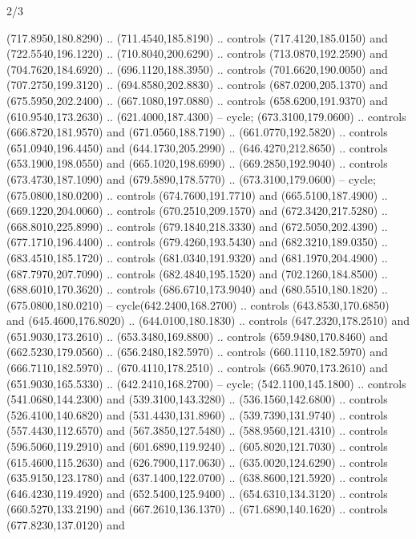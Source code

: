 \begin{flagdescription}{2/3}
\begin{scope}[xshift=0.5\flaglength,yshift=0.5\flagwidth,scale=\flagwidth/255]
\begin{scope}[y=-0.43pt, x=0.43pt,xshift=-193pt,yshift=133pt]
\begin{scope}[draw=black,line width=0.003\flagwidth]
\begin{scope}[fill=white]
  (717.8950,180.8290) .. (711.4540,185.8190) .. controls (717.4120,185.0150) and
  (722.5540,196.1220) .. (710.8040,200.6290) .. controls (713.0870,192.2590) and
  (704.7620,184.6920) .. (696.1120,188.3950) .. controls (701.6620,190.0050) and
  (707.2750,199.3120) .. (694.8580,202.8830) .. controls (687.0200,205.1370) and
  (675.5950,202.2400) .. (667.1080,197.0880) .. controls (658.6200,191.9370) and
  (610.9540,173.2630) .. (621.4000,187.4300) -- cycle;
 (673.3100,179.0600) .. controls (666.8720,181.9570) and
  (671.0560,188.7190) .. (661.0770,192.5820) .. controls (651.0940,196.4450) and
  (644.1730,205.2990) .. (646.4270,212.8650) .. controls (653.1900,198.0550) and
  (665.1020,198.6990) .. (669.2850,192.9040) .. controls (673.4730,187.1090) and
  (679.5890,178.5770) .. (673.3100,179.0600) -- cycle;
 (675.0800,180.0200) .. controls (674.7600,191.7710) and
  (665.5100,187.4900) .. (669.1220,204.0060) .. controls (670.2510,209.1570) and
  (672.3420,217.5280) .. (668.8010,225.8990) .. controls (679.1840,218.3330) and
  (672.5050,202.4390) .. (677.1710,196.4400) .. controls (679.4260,193.5430) and
  (682.3210,189.0350) .. (683.4510,185.1720) .. controls (681.0340,191.9320) and
  (681.1970,204.4900) .. (687.7970,207.7090) .. controls (682.4840,195.1520) and
  (702.1260,184.8500) .. (688.6010,170.3620) .. controls (686.6710,173.9040) and
  (680.5510,180.1820) .. (675.0800,180.0210) -- cycle(642.2400,168.2700) ..
  controls (643.8530,170.6850) and (645.4600,176.8020) .. (644.0100,180.1830) ..
  controls (647.2320,178.2510) and (651.9030,173.2610) .. (653.3480,169.8800) ..
  controls (659.9480,170.8460) and (662.5230,179.0560) .. (656.2480,182.5970) ..
  controls (660.1110,182.5970) and (666.7110,182.5970) .. (670.4110,178.2510) ..
  controls (665.9070,173.2610) and (651.9030,165.5330) .. (642.2410,168.2700) --
  cycle;
 (542.1100,145.1800) .. controls (541.0680,144.2300) and
  (539.3100,143.3280) .. (536.1560,142.6800) .. controls (526.4100,140.6820) and
  (531.4430,131.8960) .. (539.7390,131.9740) .. controls (557.4430,112.6570) and
  (567.3850,127.5480) .. (588.9560,121.4310) .. controls (596.5060,119.2910) and
  (601.6890,119.9240) .. (605.8020,121.7030) .. controls (615.4600,115.2630) and
  (626.7900,117.0630) .. (635.0020,124.6290) .. controls (635.9150,123.1780) and
  (637.1400,122.0700) .. (638.8600,121.5920) .. controls (646.4230,119.4920) and
  (652.5400,125.9400) .. (654.6310,134.3120) .. controls (660.5270,133.2190) and
  (667.2610,136.1370) .. (671.6890,140.1620) .. controls (677.8230,137.0120) and

\end{scope}
\end{scope}
\end{scope}
\end{scope}
\end{flagdescription}
